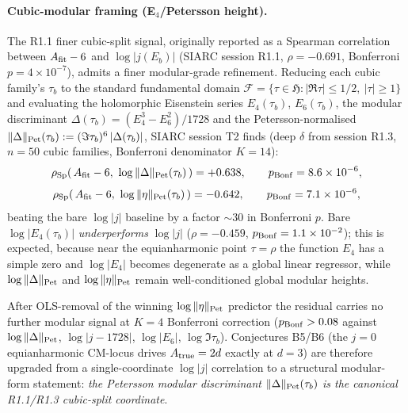 
\paragraph{Cubic-modular framing (E$_4$/Petersson height).}
The R1.1 finer cubic-split signal, originally reported as a Spearman
correlation between $A_{\rm fit}-6$ and $\log|j(E_b)|$
(SIARC session R1.1, $\rho = -0.691$, Bonferroni $p = 4\!\times\!10^{-7}$),
admits a finer modular-grade refinement. Reducing each cubic family's
$\tau_b$ to the standard fundamental domain
$\mathcal{F} = \{\tau\in\mathfrak{H} : |\Re\tau|\le 1/2,\ |\tau|\ge 1\}$
and evaluating the holomorphic Eisenstein series $E_4(\tau_b)$,
$E_6(\tau_b)$, the modular discriminant
$\Delta(\tau_b) = (E_4^3 - E_6^2)/1728$ and the Petersson-normalised
$\|\Delta\|_{\rm Pet}(\tau_b) := (\Im\tau_b)^6\,|\Delta(\tau_b)|$,
SIARC session T2 finds (deep $\delta$ from session R1.3,
$n=50$ cubic families, Bonferroni denominator $K=14$):
\begin{equation}
  \rho_{\rm Sp}(\,A_{\rm fit}-6,\ \log\|\Delta\|_{\rm Pet}(\tau_b)\,) =
  +0.638,\qquad p_{\rm Bonf} = 8.6\times 10^{-6},
\end{equation}
\begin{equation}
  \rho_{\rm Sp}(\,A_{\rm fit}-6,\ \log\|\eta\|_{\rm Pet}(\tau_b)\,) =
  -0.642,\qquad p_{\rm Bonf} = 7.1\times 10^{-6},
\end{equation}
beating the bare $\log|j|$ baseline by a factor $\sim\!30$ in
Bonferroni $p$. Bare $\log|E_4(\tau_b)|$ \emph{underperforms}
$\log|j|$ ($\rho=-0.459$, $p_{\rm Bonf}=1.1\times 10^{-2}$); this is
expected, because near the equianharmonic point $\tau=\rho$ the
function $E_4$ has a simple zero and $\log|E_4|$ becomes degenerate as
a global linear regressor, while $\log\|\Delta\|_{\rm Pet}$ and
$\log\|\eta\|_{\rm Pet}$ remain well-conditioned global modular
heights.

After OLS-removal of the winning $\log\|\eta\|_{\rm Pet}$ predictor
the residual carries no further modular signal at $K=4$ Bonferroni
correction ($p_{\rm Bonf} > 0.08$ against
$\log\|\Delta\|_{\rm Pet}$, $\log|j-1728|$, $\log|E_6|$, $\log\Im\tau_b$).
Conjectures B5/B6 (the $j=0$ equianharmonic CM-locus drives
$A_{\rm true}=2d$ exactly at $d=3$) are therefore upgraded from a
single-coordinate $\log|j|$ correlation to a structural modular-form
statement: \emph{the Petersson modular discriminant
$\|\Delta\|_{\rm Pet}(\tau_b)$ is the canonical R1.1/R1.3 cubic-split
coordinate}.

